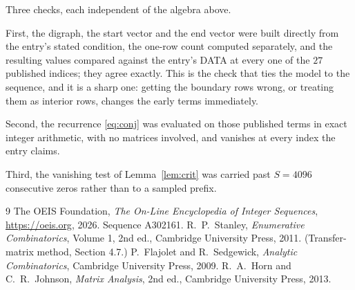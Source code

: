\documentclass[11pt,a4paper]{article}
\theoremstyle{plain}
\theoremstyle{definition}
\begin{document}
Three checks, each independent of the algebra above.

First, the digraph, the start vector and the end vector were built directly from the
entry's stated condition, the one-row count computed separately, and the resulting values
compared against the entry's DATA at every one of the $27$ published indices; they
agree exactly. This is the check that ties the model to the sequence, and it is a sharp one:
getting the boundary rows wrong, or treating them as interior rows, changes the early terms
immediately.

Second, the recurrence \eqref{eq:conj} was evaluated on those published terms in exact
integer arithmetic, with no matrices involved, and vanishes at every index the entry claims.

Third, the vanishing test of Lemma~\ref{lem:crit} was carried past $S=4096$ consecutive
zeros rather than to a sampled prefix.

\begin{thebibliography}{9}
 The OEIS Foundation, \emph{The On-Line Encyclopedia of Integer
Sequences}, \url{https://oeis.org}, 2026. Sequence A302161.
 R.~P.~Stanley, \emph{Enumerative Combinatorics}, Volume 1, 2nd ed.,
Cambridge University Press, 2011. (Transfer-matrix method, Section 4.7.)
 P.~Flajolet and R.~Sedgewick, \emph{Analytic Combinatorics}, Cambridge
University Press, 2009.
 R.~A.~Horn and C.~R.~Johnson, \emph{Matrix Analysis}, 2nd ed., Cambridge
University Press, 2013.
\end{thebibliography}
\end{document}
